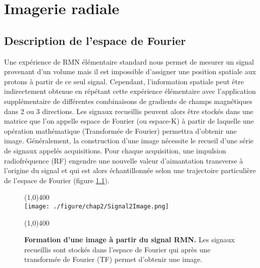 \chapter{Imagerie radiale}
\setlength{\footskip}{50pt}
\label{Chap2}
\section{Description de l'espace de Fourier}

Une expérience de RMN élémentaire standard nous permet de mesurer un signal provenant d'un volume mais il est impossible d'assigner une position spatiale aux protons à partir de ce seul signal. Cependant, l'information spatiale peut être indirectement obtenue en répétant cette expérience élémentaire avec l'application supplémentaire de différentes combinaisons de gradients de champs magnétiques dans 2 ou 3 directions. Les signaux recueillis peuvent alors être stockés dans une matrice que l'on appelle espace de Fourier (ou espace-K) à partir de laquelle une opération mathématique (Transformée de Fourier) permettra d'obtenir une image. 
Généralement, la construction d'une image nécessite le recueil d'une série de signaux appelés acquisitions. Pour chaque acquisition, une impulsion radiofréquence (RF) engendre une nouvelle valeur d'aimantation transverse à l'origine du signal et qui est alors échantillonnée selon une trajectoire particulière de l'espace de Fourier (figure \ref{fig:Signal2Image}).


\begin{figure}[h]
\centering
\line(1,0){400} \\
\texttt{[image: ./figure/chap2/Signal2Image.png]}
\caption[Formation d'une image à partir de signal RMN.]{\label{fig:Signal2Image} \textbf{Formation d'une image à partir du signal RMN.} Les signaux recueillis sont stockés dans l'espace de Fourier qui après une transformée de Fourier (TF) permet d'obtenir une image.}
\line(1,0){400} \\
\end{figure}


